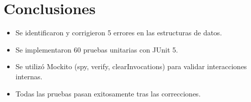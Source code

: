 \documentclass{article}
\begin{document}
\newpage
\section{Conclusiones}
\begin{itemize}
    \item Se identificaron y corrigieron 5 errores en las estructuras de datos.
    \item Se implementaron 60 pruebas unitarias con JUnit 5.
    \item Se utiliz\'o Mockito (spy, verify, clearInvocations) para validar interacciones internas.
    \item Todas las pruebas pasan exitosamente tras las correcciones.
\end{itemize}
\end{document}
